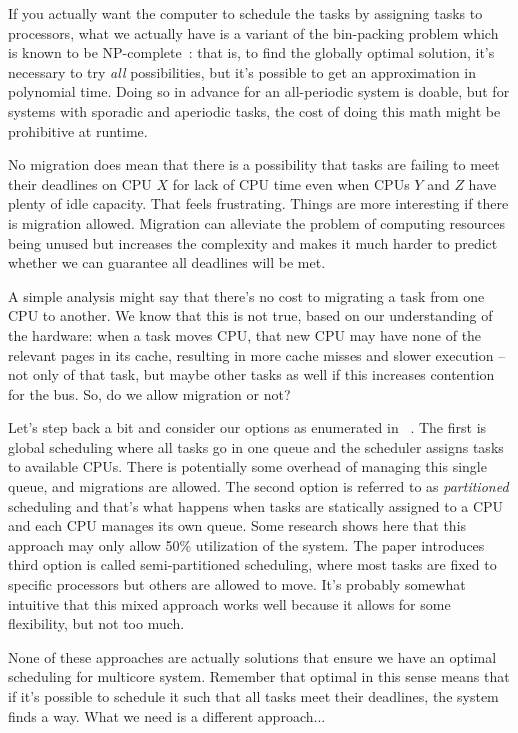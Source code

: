 If you actually want the computer to schedule the tasks by assigning tasks to processors, what we actually have is a variant of the bin-packing problem which is known to be NP-complete~\cite{sa-rt}: that is, to find the globally optimal solution, it's necessary to try \textit{all} possibilities, but it's possible to get an approximation in polynomial time. Doing so in advance for an all-periodic system is doable, but for systems with sporadic and aperiodic tasks, the cost of doing this math might be prohibitive at runtime. 

No migration does mean that there is a possibility that tasks are failing to meet their deadlines on CPU $X$ for lack of CPU time even when CPUs $Y$ and $Z$ have plenty of idle capacity. That feels frustrating. Things are more interesting if there is migration allowed. Migration can alleviate the problem of computing resources being unused but increases the complexity and makes it much harder to predict whether we can guarantee all deadlines will be met. 

A simple analysis might say that there's no cost to migrating a task from one CPU to another. We know that this is not true, based on our understanding of the hardware: when a task moves CPU, that new CPU may have none of the relevant pages in its cache, resulting in more cache misses and slower execution -- not only of that task, but maybe other tasks as well if this increases contention for the bus. So, do we allow migration or not?

Let's step back a bit and consider our options as enumerated in ~\cite{globalrts}. The first is global scheduling where all tasks go in one queue and the scheduler assigns tasks to available CPUs. There is potentially some overhead of managing this single queue, and migrations are allowed. The second option is referred to as \textit{partitioned} scheduling and that's what happens when tasks are statically assigned to a CPU and each   CPU manages its own queue. Some research shows here that this approach may only allow 50\% utilization of the system. The paper introduces third option is called semi-partitioned scheduling, where most tasks are fixed to specific processors but others are allowed to move. It's probably somewhat intuitive that this mixed approach works well because it allows for some flexibility, but not too much.

None of these approaches are actually solutions that ensure we have an optimal scheduling for multicore system. Remember that optimal in this sense means that if it's possible to schedule it such that all tasks meet their deadlines, the system finds a way. What we need is a different approach...

